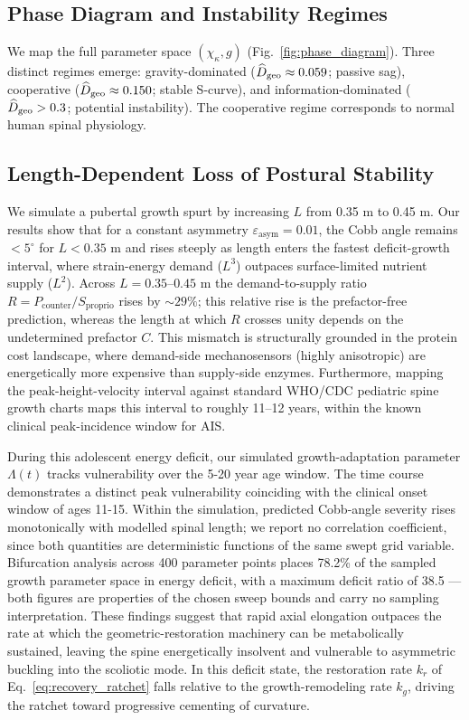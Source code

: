\subsection{Phase Diagram and Instability Regimes}

We map the full parameter space $(\chi_\kappa, g)$ (Fig.~\ref{fig:phase_diagram}). Three distinct regimes emerge: gravity-dominated ($\widehat{D}_{\mathrm{geo}} \approx 0.059$; passive sag), cooperative ($\widehat{D}_{\mathrm{geo}} \approx 0.150$; stable S-curve), and information-dominated ($\widehat{D}_{\mathrm{geo}} > 0.3$; potential instability). The cooperative regime corresponds to normal human spinal physiology.

\subsection{Length-Dependent Loss of Postural Stability}
We simulate a pubertal growth spurt by increasing $L$ from 0.35 m to 0.45 m. Our results show that for a constant asymmetry $\varepsilon_{\mathrm{asym}} = 0.01$, the Cobb angle remains $< 5^\circ$ for $L < 0.35$ m and rises steeply as length enters the fastest deficit-growth interval, where strain-energy demand ($L^3$) outpaces surface-limited nutrient supply ($L^2$). Across $L=0.35$--$0.45$ m the demand-to-supply ratio $R = P_{\mathrm{counter}}/S_{\mathrm{proprio}}$ rises by ${\sim}29\%$; this relative rise is the prefactor-free prediction, whereas the length at which $R$ crosses unity depends on the undetermined prefactor $C$. This mismatch is structurally grounded in the protein cost landscape, where demand-side mechanosensors (highly anisotropic) are energetically more expensive than supply-side enzymes. Furthermore, mapping the peak-height-velocity interval against standard WHO/CDC pediatric spine growth charts maps this interval to roughly 11--12 years, within the known clinical peak-incidence window for AIS.

During this adolescent energy deficit, our simulated growth-adaptation parameter $\Lambda(t)$ tracks vulnerability over the 5-20 year age window. The time course demonstrates a distinct peak vulnerability coinciding with the clinical onset window of ages 11-15. Within the simulation, predicted Cobb-angle severity rises monotonically with modelled spinal length; we report no correlation coefficient, since both quantities are deterministic functions of the same swept grid variable. Bifurcation analysis across 400 parameter points places 78.2\% of the sampled growth parameter space in energy deficit, with a maximum deficit ratio of 38.5 --- both figures are properties of the chosen sweep bounds and carry no sampling interpretation. These findings suggest that rapid axial elongation outpaces the rate at which the geometric-restoration machinery can be metabolically sustained, leaving the spine energetically insolvent and vulnerable to asymmetric buckling into the scoliotic mode. In this deficit state, the restoration rate $k_r$ of Eq.~\ref{eq:recovery_ratchet} falls relative to the growth-remodeling rate $k_g$, driving the ratchet toward progressive cementing of curvature.

